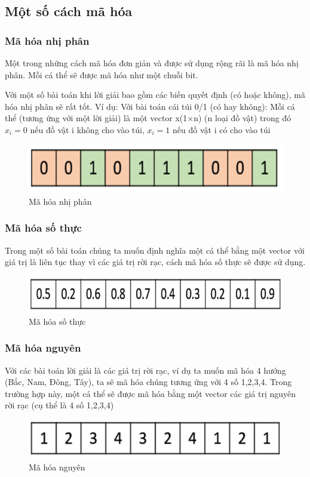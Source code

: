 \documentclass[a4paper,12pt]{report}
\begin{document}
\subsection{Một số cách mã hóa}
\subsubsection{Mã hóa nhị phân}
Một trong những cách mã hóa đơn giản và được sử dụng rộng rãi là mã hóa nhị phân. Mỗi cá thể sẽ được mã hóa như một chuỗi bit.
\par Với một số bài toán khi lời giải bao gồm các biến quyết định (có hoặc không), mã hóa nhị phân sẽ rất tốt. Ví dụ: Với bài toán cái túi 0/1 (có hay không): Mỗi cá thể (tương ứng với một lời giải) là một vector x(1$\times$n) (n loại đồ vật) trong đó $x_i=0$ nếu đồ vật i không cho vào túi, $x_i=1$ nếu đồ vật i có cho vào túi
\begin{figure}[H]
\centering 
\includegraphics[scale=0.6]{binary_representation.PNG}
\caption{Mã hóa nhị phân}
\end{figure}  

\subsubsection{Mã hóa số thực}
Trong một số bài toán chúng ta muốn định nghĩa một cá thể bằng một vector với giá trị là liên tục thay vì các giá trị rời rạc, cách mã hóa số thực sẽ được sử dụng.
\begin{figure}[H]
\centering 
\includegraphics[scale=0.6]{real_representation.PNG}
\caption{Mã hóa số thực}
\end{figure}

\subsubsection{Mã hóa nguyên}
Với các bài toán lời giải là các giá trị rời rạc, ví dụ ta muốn mã hóa 4 hướng (Bắc, Nam, Đông, Tây), ta sẽ mã hóa chúng tương ứng với 4 số {1,2,3,4}. Trong trường hợp này, một cá thể sẽ được mã hóa bằng một vector các giá trị nguyên rời rạc (cụ thể là 4 số {1,2,3,4})
\begin{figure}[H]
\centering 
\includegraphics[scale=0.6]{integer_representation.PNG}
\caption{Mã hóa nguyên}
\end{figure}
\end{document}
